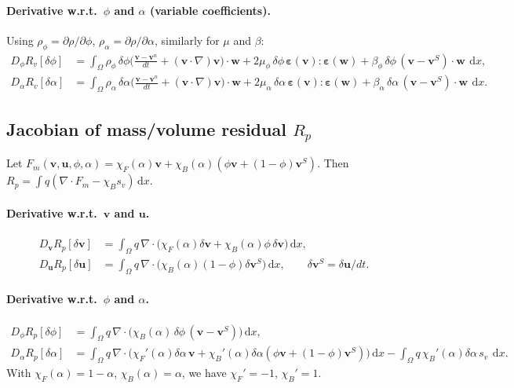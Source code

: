 \documentclass[11pt]{article}
\newcommand{\dd}{\,\mathrm{d}}
\newcommand{\grad}{\nabla}
\newcommand{\divv}{\nabla\!\cdot}
\newcommand{\eps}{\bm{\varepsilon}}
\begin{document}
\paragraph{Derivative w.r.t.\ $\phi$ and $\alpha$ (variable coefficients).}
Using $\rho_\phi=\partial\rho/\partial\phi$, $\rho_\alpha=\partial\rho/\partial\alpha$, similarly for $\mu$ and $\beta$:
\begin{align}
D_{\phi}R_v[\delta\phi] &=
\int_\Omega
\rho_\phi\,\delta\phi\Big(\frac{\bm{v}-\bm{v}^n}{dt}+(\bm{v}\cdot\grad)\bm{v}\Big)\cdot\bm{w}
+2\mu_\phi\,\delta\phi\,\eps(\bm{v}):\eps(\bm{w})
+\beta_\phi\,\delta\phi\,(\bm{v}-\bm{v}^S)\cdot\bm{w}\ \dd x,
\\
D_{\alpha}R_v[\delta\alpha] &=
\int_\Omega
\rho_\alpha\,\delta\alpha\Big(\frac{\bm{v}-\bm{v}^n}{dt}+(\bm{v}\cdot\grad)\bm{v}\Big)\cdot\bm{w}
+2\mu_\alpha\,\delta\alpha\,\eps(\bm{v}):\eps(\bm{w})
+\beta_\alpha\,\delta\alpha\,(\bm{v}-\bm{v}^S)\cdot\bm{w}\ \dd x.
\end{align}

\subsection{Jacobian of mass/volume residual $R_p$}

Let $F_m(\bm{v},\bm{u},\phi,\alpha)=\chi_F(\alpha)\bm{v}+\chi_B(\alpha)(\phi\bm{v}+(1-\phi)\bm{v}^S)$.
Then $R_p=\int q(\divv F_m - \chi_B s_v)\dd x$.

\paragraph{Derivative w.r.t.\ $\bm{v}$ and $\bm{u}$.}
\begin{align}
D_{\bm{v}}R_p[\delta\bm{v}] &= \int_\Omega q\,\divv\Big(\chi_F(\alpha)\delta\bm{v}+\chi_B(\alpha)\phi\,\delta\bm{v}\Big)\dd x,\\
D_{\bm{u}}R_p[\delta\bm{u}] &= \int_\Omega q\,\divv\Big(\chi_B(\alpha)(1-\phi)\delta\bm{v}^S\Big)\dd x, \qquad \delta\bm{v}^S=\delta\bm{u}/dt.
\end{align}

\paragraph{Derivative w.r.t.\ $\phi$ and $\alpha$.}
\begin{align}
D_{\phi}R_p[\delta\phi] &= \int_\Omega q\,\divv\Big(\chi_B(\alpha)\,\delta\phi\,(\bm{v}-\bm{v}^S)\Big)\dd x,\\
D_{\alpha}R_p[\delta\alpha] &= \int_\Omega q\,\divv\Big(\chi_F'(\alpha)\delta\alpha\,\bm{v}+\chi_B'(\alpha)\delta\alpha(\phi\bm{v}+(1-\phi)\bm{v}^S)\Big)\dd x
-\int_\Omega q\,\chi_B'(\alpha)\delta\alpha\,s_v\ \dd x.
\end{align}
With $\chi_F(\alpha)=1-\alpha$, $\chi_B(\alpha)=\alpha$, we have $\chi_F'=-1$, $\chi_B'=1$.
\end{document}
